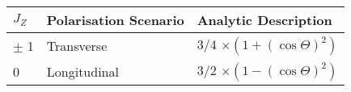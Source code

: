 \begin{tabular}{l|l|l}


\textbf{$J_{Z}$} & \textbf{Polarisation Scenario} & \textbf{Analytic Description} \\ \hline
$\pm$ 1  & Transverse &  3/4 $\times (1 + (\cos \Theta)^{2})$ \\ \hline
0  & Longitudinal & 3/2 $\times (1- (\cos \Theta)^{2})$ \\ 

\end{tabular}

